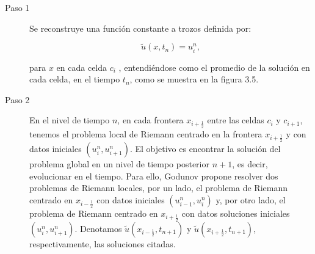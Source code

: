 \begin{description}
  \item[Paso 1]

        Se reconstruye una función constante a trozos definida por:

        \begin{equation*}
          \widetilde{u}
          \left(x,t_{n}\right)=
          u^{n}_{i},
        \end{equation*}

        para $x$ en cada celda $c_{i}$ , entendiéndose como el
        promedio de la solución en cada celda, en el tiempo $t_{n}$,
        como se muestra en la figura 3.5.

  \item[Paso 2]

        En el nivel de tiempo $n$, en cada frontera
        $x_{i+\frac{1}{2}}$ entre las celdas $c_{i}$ y $c_{i+1}$,
        tenemos el problema local de Riemann centrado en la frontera
        $x_{i+\frac{1}{2}}$ y con datos iniciales
        \begin{math}
          \left(
          u^{n}_{i},
          u^{n}_{i+1}
          \right)
        \end{math}.
        El objetivo es encontrar la solución del problema global en
        un nivel de tiempo posterior $n+1$, es decir, evolucionar en
        el tiempo.
        Para ello, Godunov propone resolver dos problemas de Riemann
        locales, por un lado, el problema de Riemann centrado en
        $x_{i-\frac{1}{2}}$ con datos iniciales
        \begin{math}
          \left(
          u^{n}_{i-1},u^{n}_{i}
          \right)
        \end{math}
        y, por otro lado, el problema de Riemann centrado en
        $x_{i+\frac{1}{2}}$ con datos soluciones iniciales
        \begin{math}
          \left(
          u^{n}_{i},
          u^{n}_{i+1}
          \right)
        \end{math}.
        Denotamos
        \begin{math}
          \widetilde{u}
          \left(
          x_{i-\frac{1}{2}},
          t_{n+1}
          \right)
        \end{math}
        y
        \begin{math}
          \widetilde{u}
          \left(
          x_{i+\frac{1}{2}},
          t_{n+1}
          \right)
        \end{math},
        respectivamente, las soluciones citadas.


\end{description}
